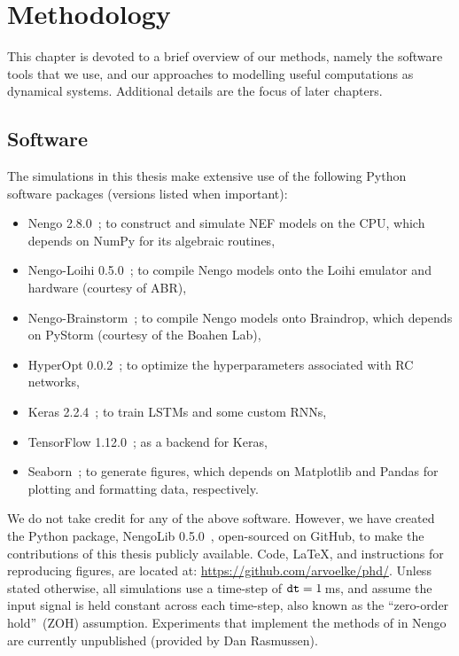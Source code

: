 \chapter{Methodology}
\label{chapt:methodology}

This chapter is devoted to a brief overview of our methods, namely the software tools that we use, and our approaches to modelling useful computations as dynamical systems.
Additional details are the focus of later chapters.

\section{Software}
\label{sec:software}

The simulations in this thesis make extensive use of the following Python software packages (versions listed when important):
\begin{itemize}
\item Nengo 2.8.0~\citep{bekolay2014}; to construct and simulate NEF models on the CPU, which depends on NumPy for its algebraic routines,
\item Nengo-Loihi 0.5.0~\citep{blouw2018a, nengoloihi}; to compile Nengo models onto the Loihi emulator and hardware (courtesy of ABR),
\item Nengo-Brainstorm~\citep[pre-release;][courtesy of Terry Stewart]{neckar2018optimizing, braindrop2019}; to compile Nengo models onto Braindrop, which depends on PyStorm (courtesy of the Boahen Lab),
\item HyperOpt 0.0.2~\citep{bergstra2015hyperopt}; to optimize the hyperparameters associated with RC networks,
\item Keras 2.2.4~\citep{gulli2017deep}; to train LSTMs and some custom RNNs,
\item TensorFlow 1.12.0~\citep{abadi2016tensorflow}; as a backend for Keras,
\item Seaborn~\citep{michael_waskom_2015_19108}; to generate figures, which depends on Matplotlib and Pandas for plotting and formatting data, respectively.
\end{itemize}
We do not take credit for any of the above software.
However, we have created the Python package, NengoLib 0.5.0~\citep[][patent~pending]{dynamicspatent, nengolib}, open-sourced on GitHub, to make the contributions of this thesis publicly available.
Code, \LaTeX{}, and instructions for reproducing figures, are located at: \url{https://github.com/arvoelke/phd/}.
Unless stated otherwise, all simulations use a time-step of $\texttt{dt}{} = 1$\,ms, and assume the input signal is held constant across each time-step, also known as the ``zero-order hold''~(ZOH) assumption.
Experiments that implement the methods of \citet{boerlin2013predictive} in Nengo are currently unpublished (provided by Dan Rasmussen).

